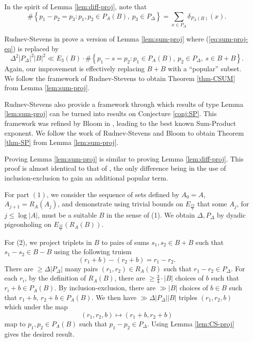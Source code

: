 \documentclass[reqno]{amsart}
\numberwithin{equation}{section}
\begin{document}
In the spirit of Lemma \ref{lem:diff-proj}, note that
\[
    \# \left\{ p_1 - p_2 = p_3 : p_1,p_2 \in P_{A} (B),~ p_3 \in P_{\Delta}  \right\}  = \sum _{x \in P_{\Delta} } \delta_{P_{A} (B)} (x)
.\]

Rudnev-Stevens in \cite{rudnev-stevens} prove a version of Lemma \ref{lem:sum-proj} where (\ref{eq:sum-proj-eq}) is replaced by
\[
    \Delta^{2} \left\lvert P_{\Delta}  \right\rvert ^{2} \left\lvert B \right\rvert ^{2} \ll E_3(B) \cdot \# \left\{ p_1 - s = p_2 : p_1 \in P_{A} (B),~ p_2 \in P_{\Delta},~ s \in B + B     \right\} 
.\]
Again, our improvement is effectively replacing \(B + B\) with a ``popular'' subset. We follow the 
framework of Rudnev-Stevens to obtain Theorem \ref{thm-CSUM} from Lemma \ref{lem:sum-proj}.

Rudnev-Stevens also provide a framework through which results of type Lemma \ref{lem:sum-proj} can
be turned into results on Conjecture \ref{conj:SP}. This framework was refined by Bloom in \cite{bloom},
leading to the best known Sum-Product exponent. We follow the work of Rudnev-Stevens
and Bloom to obtain Theorem \ref{thm-SP} from Lemma \ref{lem:sum-proj}.

Proving Lemma \ref{lem:sum-proj} is similar to proving Lemma \ref{lem:diff-proj}.
This proof is almost identical to that of \cite{rudnev-stevens}, the only difference being
in the use of inclusion-exclusion to gain an additional popular term.

For part \((1)\), we consider the sequence of sets defined by \(A_0 = A\), \(A_{j+1} = R_{A} (A_{j} )\),
and demonstrate using trivial bounds on \(E_{\frac{12}{7} } \)
that some \(A_{j} \), for \(j \leq \log \left\lvert A \right\rvert \), must be a suitable \(B\)
in the sense of (1). We obtain \(\Delta,P_{\Delta} \) by
dyadic pigeonholing on \(E_{\frac{12}{7} } (R_{A} (B))\).

For (2), we project triplets in \(B\) to pairs of sums \(s_1,s_2 \in B+B\) such that \(s_1-s_2 \in B-B\)
using the following truism
\[
    (r_1 + b) - (r_2 + b) = r_1 - r_2
.\]
There are \(\geq \Delta \left\lvert P_{\Delta}  \right\rvert \) many pairs \((r_1,r_2)\in R_{A} (B)\) such that
\(r_1 - r_2 \in P_{\Delta} \). For each \(r_{i} \), by the definition of \(R_{A} (B)\),
there are \(\geq \frac{3}{4} \cdot \left\lvert B \right\rvert \) choices of \(b\) such that \(r_{i}  + b \in P_{A} (B)\).
By inclusion-exclusion, there are \(\gg \left\lvert B \right\rvert \) choices of \(b \in B\) such that
\(r_1 + b,~ r_2 + b \in P_{A} (B)\). We then have \(\gg \Delta \left\lvert P_{\Delta}  \right\rvert \left\lvert B \right\rvert  \)  triples
\((r_1,r_2,b)\) which under the map
\[
    (r_1,r_2,b) \mapsto (r_1 + b, r_2 + b)
\] 
map to \(p_1,p_2 \in P_{A} (B)\) such that \(p_1 - p_2 \in P_{\Delta} \).
Using Lemma \ref{lem:CS-proj} gives the desired result.
\end{document}
